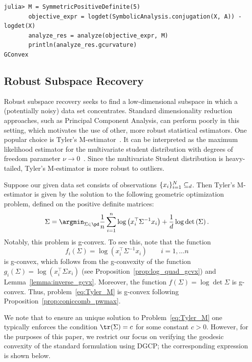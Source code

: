 \documentclass[twoside,11pt]{article}
\begin{document}
\begin{listing}[h!]
    \begin{verbatim}
julia> M = SymmetricPositiveDefinite(5)
       objective_expr = logdet(SymbolicAnalysis.conjugation(X, A)) - logdet(X)
       analyze_res = analyze(objective_expr, M)
       println(analyze_res.gcurvature)
GConvex
    \end{verbatim}
\end{listing}


\subsection{Robust Subspace Recovery}
Robust subspace recovery seeks to find a low-dimensional subspace in which a (potentially noisy) data set concentrates. Standard dimensionality reduction approaches, such as Principal Component Analysis, can perform poorly in this setting, which motivates the use of other, more robust statistical estimators. One popular choice is Tyler's M-estimator~\citep{Tyler1987}. It can be interpreted as the maximum likelihood estimator for the multivariate student distribution with degrees of freedom parameter $\nu \to 0$~\citep{Maronna2006}. Since the multivariate Student distribution is heavy-tailed, Tyler's M-estimator is more robust to outliers.

Suppose our given data set consists of observations $\{x_i\}_{i=1}^N \subseteq \real_d$. Then Tyler's M-estimator is given by the solution to the following geometric optimization problem, defined on the positive definite matrices:
\begin{equation}\label{eq:Tyler_M}
    \Sigma = \argmin_{\Sigma \in \pd} \frac{1}{n}\sum_{i=1}^n \log \left(x_i^\top \Sigma^{-1}x_i\right) + \frac{1}{d}\log \det \left(\Sigma \right).
\end{equation}
Notably, this problem is g-convex. To see this, note that the function 
\[
f_i(\Sigma) = \log \left(x_i^\top \Sigma^{-1}x_i\right) \qquad i = 1, \ldots n
\]
is g-convex, which follows from the g-convexity of the function $g_i(\Sigma) = \log \left( x_i^\top \Sigma x_i\right)$ (see Proposition~\ref{prop:log_quad_gcvx}) and Lemma~\ref{lemma:inverse_gcvx}. Moreover, the function $f(\Sigma) = \log \det \Sigma$ is g-convex. Thus, problem~\ref{eq:Tyler_M} is g-convex following Proposition~\ref{prop:coniccomb_pwmax}.

 We note that to ensure an unique solution to Problem~\eqref{eq:Tyler_M} one typically enforces the condition $\tr (\Sigma) = c$ for some constant $c > 0$. However, for the purposes of this paper, we restrict our focus on verifying the geodesic convexity of the standard formulation using DGCP; the corresponding expression is shown below.
\end{document}
